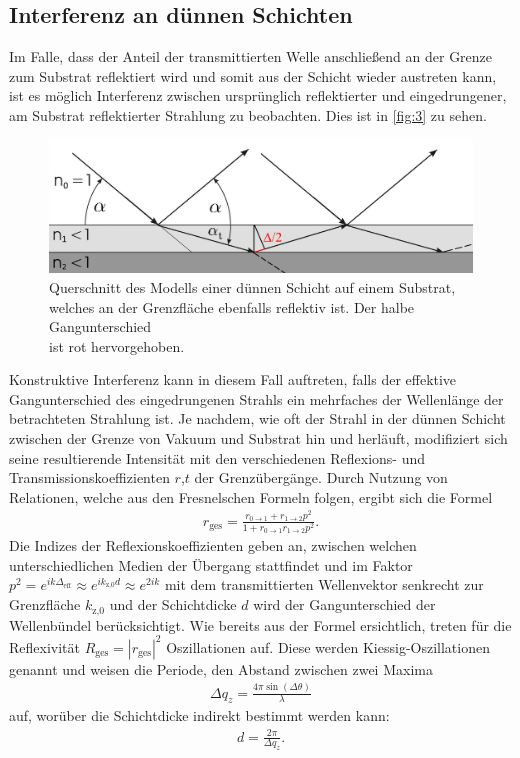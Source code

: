 \documentclass[12pt]{article}
\begin{document}
\subsection{Interferenz an dünnen Schichten}\label{subsec:interferenz}
Im Falle, dass der Anteil der transmittierten Welle anschließend an der Grenze zum Substrat reflektiert wird und somit aus der Schicht wieder austreten kann, ist es möglich Interferenz zwischen ursprünglich reflektierter und eingedrungener, am Substrat reflektierter Strahlung zu beobachten. Dies ist in \autoref{fig:3} zu sehen.
\begin{figure}[H]
  \centering
  \includegraphics[scale=0.3]{Ressourcen/schicht.png}
  \caption{Querschnitt des Modells einer dünnen Schicht auf einem Substrat,\\ welches an der Grenzfläche ebenfalls reflektiv ist. Der halbe Gangunterschied \\ ist rot hervorgehoben.}\label{fig:3}
\end{figure}
Konstruktive Interferenz kann in diesem Fall auftreten, falls der effektive Gangunterschied des eingedrungenen Strahls ein mehrfaches der Wellenlänge der betrachteten Strahlung ist.
Je nachdem, wie oft der Strahl in der dünnen Schicht zwischen der Grenze von Vakuum und Substrat hin und herläuft, modifiziert sich seine resultierende Intensität mit den verschiedenen Reflexions- und Transmissionskoeffizienten $r$,$t$ der Grenzübergänge.
Durch Nutzung von Relationen, welche aus den Fresnelschen Formeln folgen, ergibt sich die Formel
\begin{align}
  r_\text{ges}= \frac{r_{0\to1}+r_{1\to2}p^2}{1+r_{0\to1}r_{1\to2}p^2}\text{.}\label{eqn:schicht}
\end{align}
Die Indizes der Reflexionskoeffizienten geben an, zwischen welchen unterschiedlichen Medien der Übergang stattfindet und im Faktor $p^2=e^{ik\Delta_\text{eff}}\approx e^{ik_\text{z,0}d} \approx e^{2ik}$ mit dem transmittierten Wellenvektor senkrecht zur Grenzfläche $k_\text{z,0}$ und der Schichtdicke $d$ wird der Gangunterschied der Wellenbündel berücksichtigt.
Wie bereits aus der Formel ersichtlich, treten für die Reflexivität $R_\text{ges}=|r_\text{ges}|^2$ Oszillationen auf.
Diese werden Kiessig-Oszillationen genannt und weisen die Periode, den Abstand zwischen zwei Maxima 
\begin{align}
  \Delta q_z = \frac{4\pi \sin(\Delta \theta)}{\lambda}
\end{align}
auf, worüber die Schichtdicke indirekt bestimmt werden kann\cite{kiessig}:
\begin{align}
  d = \frac{2\pi}{\Delta q_z}\text{.}
\end{align}
\end{document}
